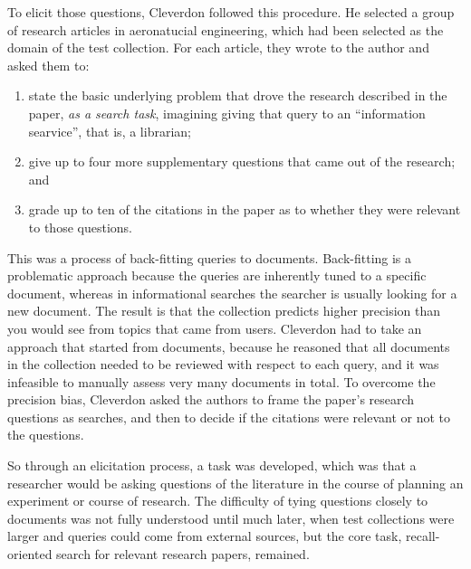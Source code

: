 \documentclass[nobib]{tufte-book}
\begin{document}
To elicit those questions, Cleverdon followed this procedure.  He selected a group of research articles in aeronatucial engineering, which had been selected as the domain of the test collection.  For each article, they wrote to the author and asked them to:
\begin{enumerate}
    \item state the basic underlying problem that drove the research described in the paper, {\em as a search task}, imagining giving that query to an ``information searvice'', that is, a librarian;
    \item give up to four more supplementary questions that came out of the research; and
    \item grade up to ten of the citations in the paper as to whether they were relevant to those questions.
\end{enumerate}

This was a process of back-fitting queries to documents.  Back-fitting is a problematic approach because the queries are inherently tuned to a specific document, whereas in informational searches the searcher is usually looking for a new document.  The result is that the collection predicts higher precision than you would see from topics that came from users. 
Cleverdon had to take an approach that started from documents, because he reasoned that all documents in the collection needed to be reviewed with respect to each query, and it was infeasible to manually assess very many documents in total.
To overcome the precision bias, Cleverdon asked the authors to frame the paper's research questions as searches, and then to decide if the citations were relevant or not to the questions.

So through an elicitation process, a task was developed, which was that a researcher would be asking questions of the literature in the course of planning an experiment or course of research.  The difficulty of tying questions closely to documents was not fully understood until much later, when test collections were larger and queries could come from external sources, but the core task, recall-oriented search for relevant research papers, remained.
\end{document}
